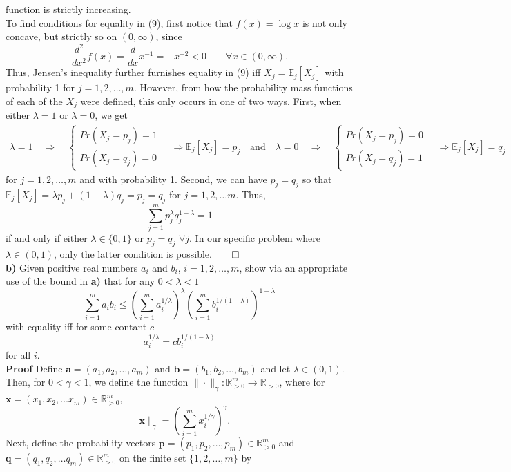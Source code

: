 \documentclass[11pt, letterpaper]{article}
\newcommand{\bs}[1]{\boldsymbol{#1}}
\newcommand{\mbb}[1]{\mathbb{#1}}
\begin{document}
function is strictly increasing.\\[10pt]
To find conditions for equality in (9), first notice that $f(x)=\log x$ is not only concave, but strictly so on $(0,\infty)$, since
\[\frac{d^2}{dx^2}f(x)=\frac{d}{dx}x^{-1}=-x^{-2}<0\qquad\forall x\in(0,\infty).\]
Thus, Jensen's inequality further furnishes equality in (9) iff $X_j=\mbb{E}_j[X_j]$ with probability 1 for $j=1,2,\dots,m$. However, from how the probability mass functions of
each of the $X_j$ were defined, this only occurs in one of two ways. First, when either $\lambda=1$ or $\lambda=0$, we get
\begin{align*}
    \lambda=1\quad\Rightarrow\quad\begin{cases}
        Pr(X_j=p_j)=1\\
        Pr(X_j=q_j)=0
    \end{cases}\quad\Rightarrow\mbb{E}_j[X_j]=p_j\quad\text{and}\quad\lambda=0\quad\Rightarrow\quad\begin{cases}
        Pr(X_j=p_j)=0\\
        Pr(X_j=q_j)=1
    \end{cases}\quad\Rightarrow\mbb{E}_j[X_j]=q_j
\end{align*}
for $j=1,2,\dots, m$ and with probability 1. Second, we can have $p_j=q_j$ so that $\mbb{E}_j[X_j]=\lambda p_j+(1-\lambda)q_j=p_j=q_j$ for $j=1,2,\dots m$.
Thus,
\[\sum_{j=1}^mp_j^\lambda q_j^{1-\lambda}=1\]
if and only if either $\lambda\in\{0,1\}$ or $p_j=q_j$ $\forall j$. In our specific problem where $\lambda\in(0,1)$, only the latter condition is possible.\hfill{$\qed$}\\[10pt]
{\bf b)} Given positive real numbers $a_i$ and $b_i$, $i=1,2,\dots,m$, show via an appropriate use of the bound in {\bf a)} that for any $0<\lambda<1$
\[\sum_{i=1}^ma_ib_i\leq\left(\sum_{i=1}^ma_i^{1/\lambda}\right)^{\lambda}\left(\sum_{i=1}^mb_i^{1/(1-\lambda)}\right)^{1-\lambda}\]
with equality iff for some contant $c$
\[a_i^{1/\lambda}=cb_i^{1/(1-\lambda)}\]
for all $i$.\\[10pt]
{\bf Proof} Define $\bs{a}=(a_1,a_2,\dots,a_m)$ and $\bs{b}=(b_1,b_2,\dots,b_m)$ and let $\lambda\in (0,1)$. Then, for $0<\gamma<1$, we define the function $\|\cdot\|_\gamma:\mbb{R}^m_{>0}\rightarrow\mbb{R}_{>0}$,
where for $\bs{x}=(x_1,x_2,\dots x_m)\in\mbb{R}^m_{>0}$, 
\[\|\bs{x}\|_\gamma=\left(\sum_{i=1}^mx_i^{1/\gamma}\right)^\gamma.\]
Next, define the probability vectors $\bs{p}=(p_1,p_2,\dots,p_m)\in\mbb{R}^m_{>0}$ and $\bs{q}=(q_1,q_2,\dots q_m)\in\mbb{R}^m_{>0}$ on the finite set $\{1,2,\dots, m\}$ by
\end{document}
